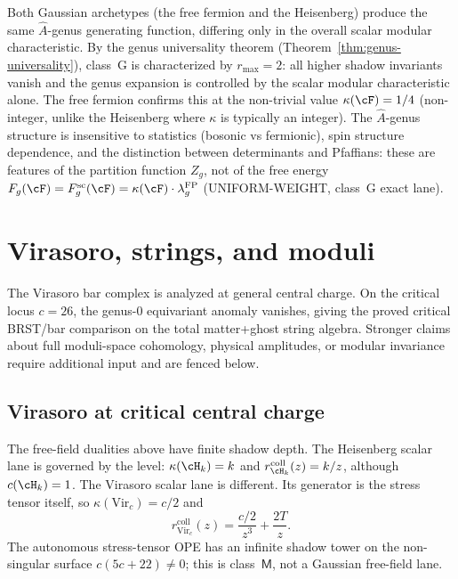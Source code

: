 \begin{remark}
\label{rem:fermion-ahat-universality}
Both Gaussian archetypes (the free fermion and the Heisenberg)
produce the same $\hat{A}$-genus generating function,
differing only in the overall scalar modular characteristic.
By the genus universality theorem
(Theorem~\ref{thm:genus-universality}), class~G
is characterized by $r_{\max} = 2$: all higher
shadow invariants vanish and the genus expansion is
controlled by the scalar modular characteristic alone.
The free fermion confirms this at the non-trivial
value $\kappa(\cF)=1/4$ (non-integer, unlike the Heisenberg
where $\kappa$ is typically an integer). The
$\hat{A}$-genus structure is insensitive to statistics
(bosonic vs fermionic), spin structure dependence, and the
distinction between determinants and Pfaffians: these are
features of the partition function $Z_g$, not of the
free energy
$F_g(\cF)=F_g^{\mathrm{sc}}(\cF)
=\kappa(\cF) \cdot \lambda_g^{\mathrm{FP}}$
\textup{(}UNIFORM-WEIGHT, class~G exact lane\textup{)}.
\end{remark}


\section{Virasoro, strings, and moduli}\label{sec:virasoro-strings-moduli}

The Virasoro bar complex is analyzed at general central charge. On the
critical locus $c = 26$, the genus-$0$ equivariant anomaly vanishes,
giving the proved critical BRST/bar comparison on the total
matter+ghost string algebra. Stronger claims about full moduli-space
cohomology, physical amplitudes, or modular invariance require
additional input and are fenced below.

\subsection{Virasoro at critical central charge}

The free-field dualities above have finite shadow depth. The
Heisenberg scalar lane is governed by the level:
$\kappa(\cH_k)=k$ and
$r_{\cH_k}^{\mathrm{coll}}(z)=k/z$, although
$c(\cH_k)=1$. The Virasoro scalar lane is different. Its generator is
the stress tensor itself, so
$\kappa(\mathrm{Vir}_c)=c/2$ and
\[
r_{\mathrm{Vir}_c}^{\mathrm{coll}}(z)
=\frac{c/2}{z^3}+\frac{2T}{z}.
\]
The autonomous stress-tensor OPE has an infinite shadow tower on the
non-singular surface $c(5c+22)\neq0$; this is class~$\mathsf M$, not a
Gaussian free-field lane.

